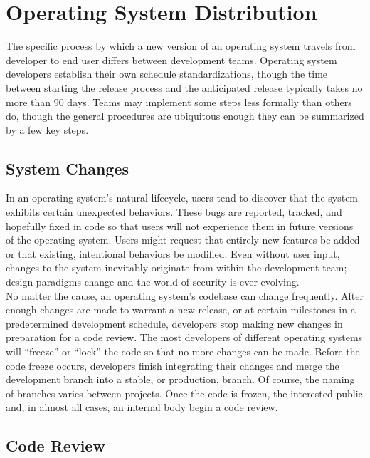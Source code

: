 \documentclass[conference]{IEEEtran}
\begin{document}
\section{Operating System Distribution}

The specific process by which a new version of an operating system
travels from developer to end user differs between development teams.
Operating system developers establish their own schedule
standardizations, though the time between starting the release process
and the anticipated release typically takes no more than 90 days.
Teams may implement some steps less formally than others do,
though the general procedures are ubiquitous enough they can be
summarized by a few key steps.

\subsection{System Changes}

In an operating system's natural lifecycle, users tend to discover that
the system exhibits certain unexpected behaviors.
These bugs are reported, tracked, and hopefully fixed in code so that
users will not experience them in future versions of the operating system.
Users might request that entirely new features be added
or that existing, intentional behaviors be modified.
Even without user input, changes to the system inevitably
originate from within the development team; design paradigms change
and the world of security is ever-evolving.\\
\indent No matter the cause, an operating system's codebase can change
frequently. After enough changes are made to warrant a new release,
or at certain milestones in a predetermined development schedule,
developers stop making new changes in preparation for a code review.
The most developers of different operating systems will ``freeze''
or ``lock'' the code so that no more changes can be made.
Before the code freeze occurs, developers finish integrating their changes
and merge the development branch into a stable, or production, branch.
Of course, the naming of branches varies between projects.
Once the code is frozen, the interested public and, in almost all cases,
an internal body begin a code review.

\subsection{Code Review}
\end{document}
